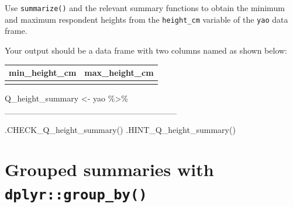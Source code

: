 \documentclass[
  letterpaper,
  DIV=11,
  numbers=noendperiod]{scrreprt}
\newenvironment{Shaded}{\begin{snugshade}}{\end{snugshade}}
\newcommand{\FunctionTok}[1]{\textcolor[rgb]{0.28,0.35,0.67}{#1}}
\newcommand{\NormalTok}[1]{\textcolor[rgb]{0.00,0.23,0.31}{#1}}
\newcommand{\OtherTok}[1]{\textcolor[rgb]{0.00,0.23,0.31}{#1}}
\newcommand{\SpecialCharTok}[1]{\textcolor[rgb]{0.37,0.37,0.37}{#1}}
\begin{document}
\begin{tcolorbox}[enhanced jigsaw, colframe=quarto-callout-tip-color-frame, rightrule=.15mm, opacityback=0, breakable, coltitle=black, colbacktitle=quarto-callout-tip-color!10!white, bottomrule=.15mm, leftrule=.75mm, toprule=.15mm, arc=.35mm, bottomtitle=1mm, colback=white, left=2mm, opacitybacktitle=0.6, titlerule=0mm, title=\textcolor{quarto-callout-tip-color}{\faLightbulb}\hspace{0.5em}{Practice}, toptitle=1mm]

Use \texttt{summarize()} and the relevant summary functions to obtain
the minimum and maximum respondent heights from the \texttt{height\_cm}
variable of the \texttt{yao} data frame.

Your output should be a data frame with two columns named as shown
below:

\begin{longtable}[]{@{}ll@{}}
\toprule\noalign{}
min\_height\_cm & max\_height\_cm \\
\midrule\noalign{}
\endhead
\bottomrule\noalign{}
\endlastfoot
& \\
\end{longtable}

\begin{Shaded}
\begin{Highlighting}[]
\NormalTok{Q\_height\_summary }\OtherTok{\textless{}{-}} 
\NormalTok{  yao }\SpecialCharTok{\%\textgreater{}\%} 
\NormalTok{  \_\_\_\_\_\_\_\_\_\_\_\_\_\_\_\_\_\_\_\_\_\_\_\_\_\_\_\_}
\end{Highlighting}
\end{Shaded}

\begin{Shaded}
\begin{Highlighting}[]
\FunctionTok{.CHECK\_Q\_height\_summary}\NormalTok{()}
\FunctionTok{.HINT\_Q\_height\_summary}\NormalTok{()}
\end{Highlighting}
\end{Shaded}

\end{tcolorbox}

\hypertarget{grouped-summaries-with-dplyrgroup_by}{%
\section{\texorpdfstring{Grouped summaries with
\texttt{dplyr::group\_by()}}{Grouped summaries with dplyr::group\_by()}}\label{grouped-summaries-with-dplyrgroup_by}}
\end{document}
